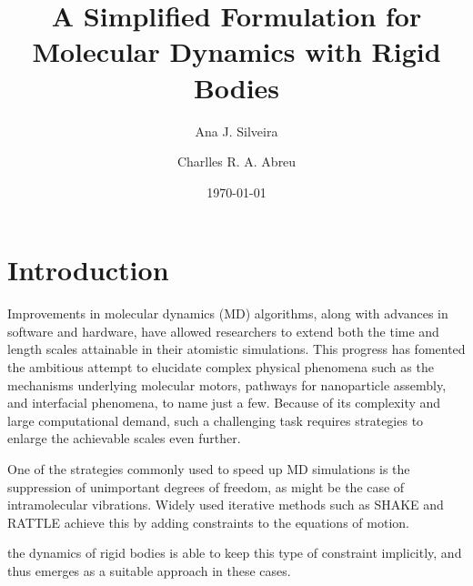 \documentclass[aip,jcp,reprint,amsmath,amssymb]{revtex4-1}
\begin{document}
\title{A Simplified Formulation for Molecular Dynamics with Rigid Bodies}

\author{Ana J. Silveira}

\author{Charlles R. A. Abreu}

\date{\today}

\maketitle

\section{Introduction}

Improvements in molecular dynamics (MD) algorithms, along with advances in software and hardware, have allowed researchers to extend both the time and length scales attainable in their atomistic simulations. This progress has fomented the ambitious attempt to elucidate complex physical phenomena such as the mechanisms underlying molecular motors, pathways for nanoparticle assembly, and interfacial phenomena, to name just a few. Because of its complexity and large computational demand, such a challenging task requires strategies to enlarge the achievable scales even further.

One of the strategies commonly used to speed up MD simulations is the suppression of unimportant degrees of freedom, as might be the case of intramolecular vibrations. Widely used iterative methods such as SHAKE\cite{Ryckaert1977} and RATTLE\cite{Andersen1983} achieve this by adding constraints to the equations of motion.

the dynamics of rigid bodies is able to keep this type of constraint implicitly, and thus emerges as a suitable approach in these cases.
\end{document}
